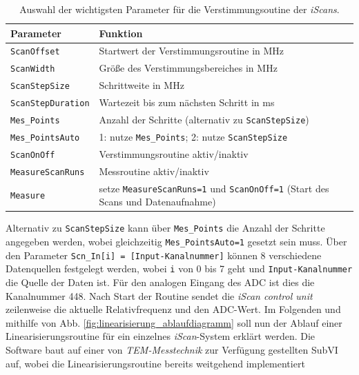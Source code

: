 \begin{table}
	\begin{tabular}{p{}p{}}
		\toprule
			Parameter & Funktion \\
		\midrule[1px]
		\hline
			\lstinline|ScanOffset| & Startwert der Verstimmungsroutine in MHz\\
			\lstinline|ScanWidth| & Größe des Verstimmungsbereiches in MHz\\
			\lstinline|ScanStepSize| & Schrittweite in MHz\\
			\lstinline|ScanStepDuration| & Wartezeit bis zum nächsten Schritt in ms\\
			\lstinline|Mes_Points| & Anzahl der Schritte (alternativ zu
			\lstinline|ScanStepSize|)\\
			\lstinline|Mes_PointsAuto| & 1: nutze \lstinline|Mes_Points|; 2: nutze
			\lstinline|ScanStepSize|\\
			\lstinline|ScanOnOff| & Verstimmungsroutine aktiv/inaktiv\\
			\lstinline|MeasureScanRuns| & Messroutine aktiv/inaktiv\\
			\lstinline|Measure| & setze
			\lstinline|MeasureScanRuns=1| und \lstinline|ScanOnOff=1| (Start des Scans
			und Datenaufnahme)\\
		\bottomrule[1px]
	\end{tabular}
	\caption[Parameter der Verstimmungsroutine]{Auswahl der wichtigsten Parameter
	für die Verstimmungsoutine der \textit{iScans}.}
	\label{tab:verstimmungsroutine_parameter}
\end{table}
Alternativ zu \lstinline|ScanStepSize| kann über \lstinline|Mes_Points| die
Anzahl der Schritte angegeben werden, wobei gleichzeitig
\lstinline|Mes_PointsAuto=1| gesetzt sein muss. Über den Parameter
\lstinline|Scn_In[i] = [Input-Kanalnummer]| können 8
verschiedene Datenquellen festgelegt werden, wobei
\lstinline|i| von 0 bis 7 geht und \lstinline|Input-Kanalnummer| die Quelle
der Daten ist. Für den analogen Eingang des ADC ist dies die Kanalnummer 448.
Nach Start der Routine sendet die \textit{iScan control unit} zeilenweise
die aktuelle Relativfrequenz und den ADC-Wert. Im Folgenden und mithilfe von
Abb. \ref{fig:linearisierung_ablaufdiagramm} soll nun der Ablauf einer
Linearisierungsroutine für ein einzelnes \textit{iScan}-System erklärt werden.
Die Software baut auf einer von \textit{TEM-Messtechnik} zur Verfügung gestellten
SubVI auf, wobei die Linearisierungsroutine bereits weitgehend implementiert
